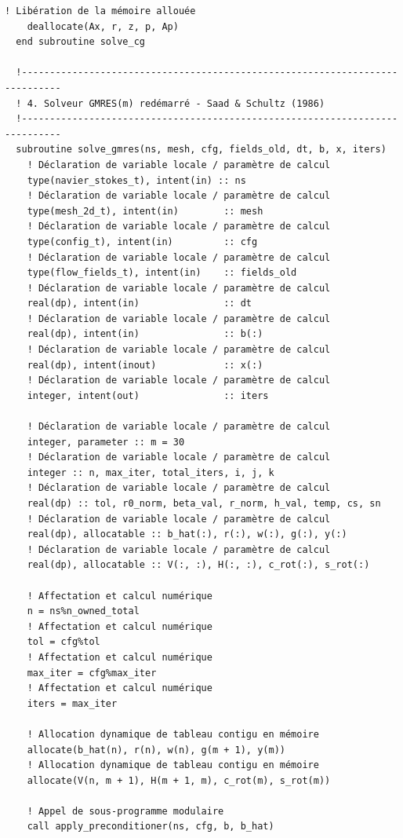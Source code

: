 \documentclass[10pt,a4paper,oneside]{book}
\begin{document}
\begin{lstlisting}[language={[95]Fortran}]
    ! Libération de la mémoire allouée
    deallocate(Ax, r, z, p, Ap)
  end subroutine solve_cg

  !-----------------------------------------------------------------------------
  ! 4. Solveur GMRES(m) redémarré - Saad & Schultz (1986)
  !-----------------------------------------------------------------------------
  subroutine solve_gmres(ns, mesh, cfg, fields_old, dt, b, x, iters)
    ! Déclaration de variable locale / paramètre de calcul
    type(navier_stokes_t), intent(in) :: ns
    ! Déclaration de variable locale / paramètre de calcul
    type(mesh_2d_t), intent(in)        :: mesh
    ! Déclaration de variable locale / paramètre de calcul
    type(config_t), intent(in)         :: cfg
    ! Déclaration de variable locale / paramètre de calcul
    type(flow_fields_t), intent(in)    :: fields_old
    ! Déclaration de variable locale / paramètre de calcul
    real(dp), intent(in)               :: dt
    ! Déclaration de variable locale / paramètre de calcul
    real(dp), intent(in)               :: b(:)
    ! Déclaration de variable locale / paramètre de calcul
    real(dp), intent(inout)            :: x(:)
    ! Déclaration de variable locale / paramètre de calcul
    integer, intent(out)               :: iters

    ! Déclaration de variable locale / paramètre de calcul
    integer, parameter :: m = 30
    ! Déclaration de variable locale / paramètre de calcul
    integer :: n, max_iter, total_iters, i, j, k
    ! Déclaration de variable locale / paramètre de calcul
    real(dp) :: tol, r0_norm, beta_val, r_norm, h_val, temp, cs, sn
    ! Déclaration de variable locale / paramètre de calcul
    real(dp), allocatable :: b_hat(:), r(:), w(:), g(:), y(:)
    ! Déclaration de variable locale / paramètre de calcul
    real(dp), allocatable :: V(:, :), H(:, :), c_rot(:), s_rot(:)

    ! Affectation et calcul numérique
    n = ns%n_owned_total
    ! Affectation et calcul numérique
    tol = cfg%tol
    ! Affectation et calcul numérique
    max_iter = cfg%max_iter
    ! Affectation et calcul numérique
    iters = max_iter

    ! Allocation dynamique de tableau contigu en mémoire
    allocate(b_hat(n), r(n), w(n), g(m + 1), y(m))
    ! Allocation dynamique de tableau contigu en mémoire
    allocate(V(n, m + 1), H(m + 1, m), c_rot(m), s_rot(m))

    ! Appel de sous-programme modulaire
    call apply_preconditioner(ns, cfg, b, b_hat)


\end{lstlisting}
\end{document}
